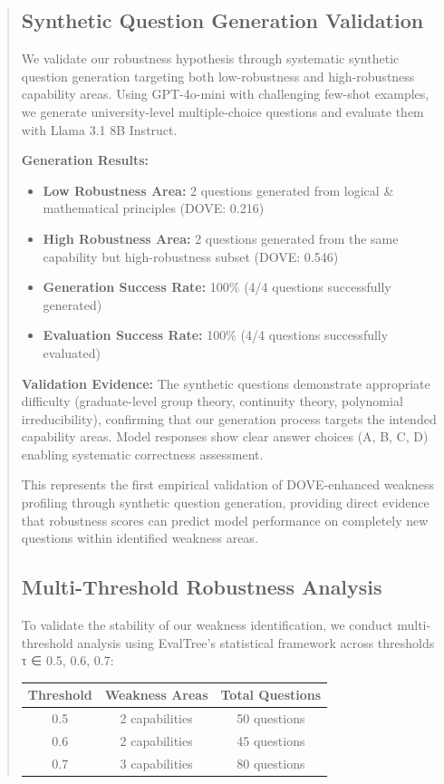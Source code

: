 \documentclass[11pt]{article}
\begin{document}
\begin{abstract}
\subsection{Synthetic Question Generation Validation}

We validate our robustness hypothesis through systematic synthetic question generation targeting both low-robustness and high-robustness capability areas. Using GPT-4o-mini with challenging few-shot examples, we generate university-level multiple-choice questions and evaluate them with Llama 3.1 8B Instruct.

\textbf{Generation Results:}
\begin{itemize}
    \item \textbf{Low Robustness Area:} 2 questions generated from logical \& mathematical principles (DOVE: 0.216)
    \item \textbf{High Robustness Area:} 2 questions generated from the same capability but high-robustness subset (DOVE: 0.546)
    \item \textbf{Generation Success Rate:} 100\% (4/4 questions successfully generated)
    \item \textbf{Evaluation Success Rate:} 100\% (4/4 questions successfully evaluated)
\end{itemize}

\textbf{Validation Evidence:} The synthetic questions demonstrate appropriate difficulty (graduate-level group theory, continuity theory, polynomial irreducibility), confirming that our generation process targets the intended capability areas. Model responses show clear answer choices (A, B, C, D) enabling systematic correctness assessment.

This represents the first empirical validation of DOVE-enhanced weakness profiling through synthetic question generation, providing direct evidence that robustness scores can predict model performance on completely new questions within identified weakness areas.

\subsection{Multi-Threshold Robustness Analysis}

To validate the stability of our weakness identification, we conduct multi-threshold analysis using EvalTree's statistical framework across thresholds τ ∈ {0.5, 0.6, 0.7}:

\begin{center}
\begin{tabular}{ccc}
\hline
\textbf{Threshold} & \textbf{Weakness Areas} & \textbf{Total Questions} \\
\hline
0.5 & 2 capabilities & 50 questions \\
0.6 & 2 capabilities & 45 questions \\
0.7 & 3 capabilities & 80 questions \\
\hline
\end{tabular}
\end{center}


\end{abstract}
\end{document}
